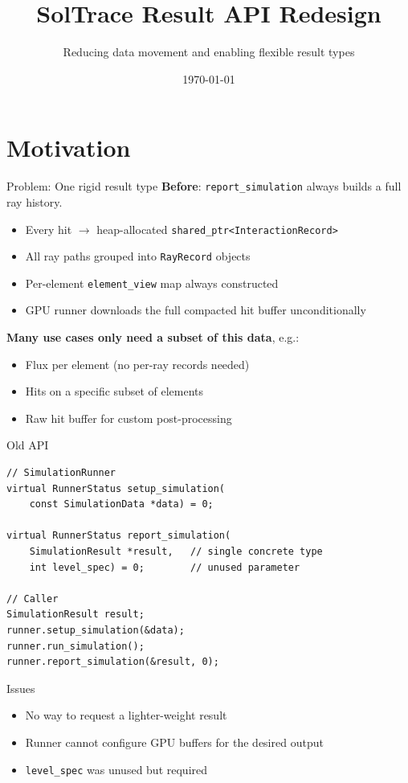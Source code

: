 \documentclass{beamer}
\title{SolTrace Result API Redesign}
\subtitle{Reducing data movement and enabling flexible result types}
\date{\today}
\begin{document}
\maketitle

\section{Motivation}

\begin{frame}{Problem: One rigid result type}
\textbf{Before}: \lstinline|report_simulation| always builds a full ray history.
\begin{itemize}
  \item Every hit $\rightarrow$ heap-allocated \lstinline|shared_ptr<InteractionRecord>|
  \item All ray paths grouped into \lstinline|RayRecord| objects
  \item Per-element \lstinline|element_view| map always constructed
  \item GPU runner downloads the full compacted hit buffer unconditionally
\end{itemize}
\vspace{0.5em}
\textbf{Many use cases only need a subset of this data}, e.g.:
\begin{itemize}
  \item Flux per element (no per-ray records needed)
  \item Hits on a specific subset of elements
  \item Raw hit buffer for custom post-processing
\end{itemize}
\end{frame}

\begin{frame}[fragile]{Old API}
\begin{lstlisting}
// SimulationRunner
virtual RunnerStatus setup_simulation(
    const SimulationData *data) = 0;

virtual RunnerStatus report_simulation(
    SimulationResult *result,   // single concrete type
    int level_spec) = 0;        // unused parameter

// Caller
SimulationResult result;
runner.setup_simulation(&data);
runner.run_simulation();
runner.report_simulation(&result, 0);
\end{lstlisting}
\begin{alertblock}{Issues}
\begin{itemize}
  \item No way to request a lighter-weight result
  \item Runner cannot configure GPU buffers for the desired output
  \item \lstinline|level_spec| was unused but required
\end{itemize}
\end{alertblock}
\end{frame}
\end{document}
